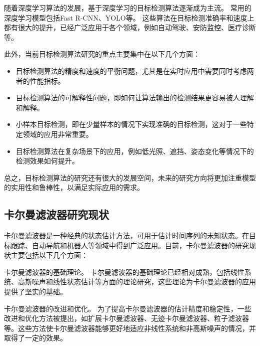 随着深度学习算法的发展，基于深度学习的目标检测算法逐渐成为主流。
常用的深度学习模型包括Fast R-CNN\cite{girshick2015fast}、YOLO\cite{jiang2022review}等。
这些算法在目标检测准确率和速度上都有很大的提升，已经广泛应用于各个领域，例如自动驾驶、安防监控、医疗诊断等。
\par
此外，当前目标检测算法研究的重点主要集中在以下几个方面：
\begin{itemize}[itemindent=2em]
    \item 目标检测算法的精度和速度的平衡问题，尤其是在实时应用中需要同时考虑两者的性能指标。
    
    \item 目标检测算法的可解释性问题，即如何让算法输出的检测结果更容易被人理解和解释。
    
    \item 小样本目标检测，即在少量样本的情况下实现准确的目标检测，这对于一些特定领域的应用非常重要。
    
    \item 目标检测算法在复杂场景下的应用，例如低光照、遮挡、姿态变化等情况下的检测效果如何提升。
    
\end{itemize}


总之，目标检测算法的研究还有很大的发展空间，未来的研究方向将更加注重模型的实用性和鲁棒性，以满足实际应用的需求。

\subsection{卡尔曼滤波器研究现状}
卡尔曼滤波器是一种经典的状态估计方法，可用于估计时间序列的未知状态。在目标跟踪、自动导航和机器人等领域中得到广泛应用。目前，卡尔曼滤波器的研究现状主要包括以下几个方面：
\par
卡尔曼滤波器的基础理论。
卡尔曼滤波器的基础理论已经相对成熟，包括线性系统、高斯噪声和线性状态估计等方面的理论研究，这些理论为卡尔曼滤波器的应用提供了坚实的基础。
\par
卡尔曼滤波器的改进和优化。
为了提高卡尔曼滤波器的估计精度和稳定性，一些改进和优化方法被提出，如扩展卡尔曼滤波器\cite{ribeiro2004kalman}、无迹卡尔曼滤波器\cite{wan2000unscented}、粒子滤波器\cite{gustafsson2010particle}等。这些方法使卡尔曼滤波器能够更好地适应非线性系统和非高斯噪声的情况，并取得了一定的效果。

